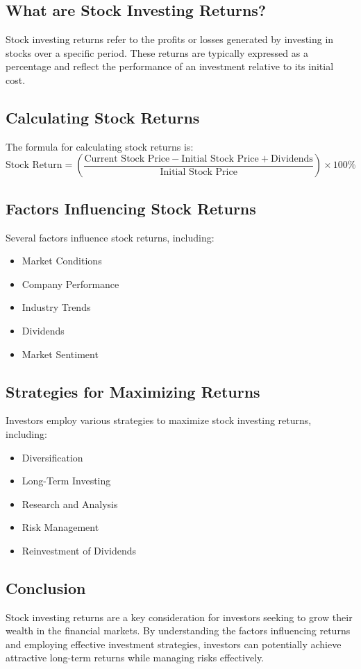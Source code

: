\subsection{What are Stock Investing Returns?}
Stock investing returns refer to the profits or losses generated by investing in stocks over a specific period. These returns are typically expressed as a percentage and reflect the performance of an investment relative to its initial cost.

\subsection{Calculating Stock Returns}
The formula for calculating stock returns is:
\[ \text{Stock Return} = \left( \frac{\text{Current Stock Price} - \text{Initial Stock Price} + \text{Dividends}}{\text{Initial Stock Price}} \right) \times 100\% \]

\subsection{Factors Influencing Stock Returns}
Several factors influence stock returns, including:
\begin{itemize}
    \item Market Conditions
    \item Company Performance
    \item Industry Trends
    \item Dividends
    \item Market Sentiment
\end{itemize}

\subsection{Strategies for Maximizing Returns \cite{returns}}
Investors employ various strategies to maximize stock investing returns, including:
\begin{itemize}
    \item Diversification
    \item Long-Term Investing
    \item Research and Analysis
    \item Risk Management
    \item Reinvestment of Dividends
\end{itemize}

\subsection{Conclusion}
Stock investing returns are a key consideration for investors seeking to grow their wealth in the financial markets. By understanding the factors influencing returns and employing effective investment strategies, investors can potentially achieve attractive long-term returns while managing risks effectively.



